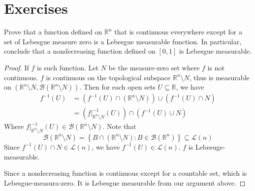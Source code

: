 \documentclass[../main.tex]{subfiles}
\begin{document}
\section*{Exercises}
\begin{exercise}{}{}
    Prove that a function defined on $\mathbb{R}^n$ that is continuous everywhere except for a set of Lebesgue measure zero is a Lebesgue measurable function. In particular, conclude that a nondecreasing function defined on $[0, 1]$ is Lebesgue measurable.
\end{exercise}
\begin{proof}

    If \(  f  \) is such function. 
    Let \(  N  \) be the measure-zero set where \(  f  \) is not continuous.  \(  f  \) is continuous on the topological subspace \(  \mathbb{R} ^{n}\setminus N  \), thus is measurable on \(  \left( \mathbb{R} ^{n}\setminus N, \mathcal{B}\left( \mathbb{R} ^{n}\setminus N \right)  \right)   \). Then for each open sets \(  U\subseteq \mathbb{R}  \), we have \[
\begin{aligned}
    f^{-1} \left( U \right)&= \left( f^{-1} \left( U \right)\cap \left( \mathbb{R} ^{n}\setminus N \right)   \right)\cup \left( f^{-1} \left( U \right)\cap N  \right)   \\ 
     &= \left( f|_{\mathbb{R} ^{n}\setminus N}^{-1} \left( U \right)  \right)\cap \left( f^{-1} \left( U \right)\cup N  \right)   
\end{aligned}    \]     Where \(  f|_{\mathbb{R} ^{n}\setminus N}^{-1} \left( U \right)\in \mathcal{B}\left( \mathbb{R} ^{n}\setminus N \right)\). Note that \[
\mathcal{B}\left( \mathbb{R} ^{n}\setminus N \right)= \left\{ B\cap \left( \mathbb{R} ^{n}\setminus N \right): B\in \mathcal{B}\left( \mathbb{R} ^{n} \right)   \right\}\subseteq \mathcal{L}\left( n \right)  
\]Since \(  f^{-1} \left( U \right)\cap N   \in \mathcal{L}\left( n \right) \), we have \(  f^{-1} \left( U \right)\in \mathcal{L}\left( n \right)    \). \(  f  \) is Lebesuge-measurable.    

Since a nondecreasing function is continuous except for a countable set, which is Lebesgue-measura-zero. It is Lebesgue measurable from our argument above.
\end{proof}
\end{document}
